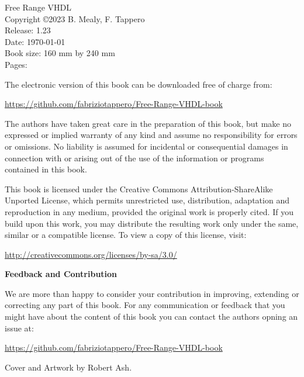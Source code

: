 %
%

{\footnotesize
\noindent
Free Range VHDL\\
Copyright \copyright 2023 B. Mealy, F. Tappero\\
Release: 1.23 \\
Date: \today\\
Book size: 160 mm by 240 mm\\
Pages: \\
\vspace{20pt}

\noindent
The electronic version of this book can be downloaded free of charge from:

\noindent
\url{https://github.com/fabriziotappero/Free-Range-VHDL-book}

\vspace{15pt}

\noindent
The authors have taken great care in the preparation of this book, but make no expressed or implied warranty of any kind and assume no responsibility for errors or omissions. No liability is assumed for incidental or consequential damages in connection with or arising out of the use of the information or programs contained in this book.

\vspace{15pt}

\noindent
This book is licensed under the Creative Commons Attribution-ShareAlike Unported License, which permits unrestricted use, distribution, adaptation and reproduction in any medium, provided the original work is properly cited. If you build upon this work, you may distribute the resulting work only under the same, similar or a compatible license. To view a copy of this license, visit:

\noindent
\url{http://creativecommons.org/licenses/by-sa/3.0/}
\vspace{25pt}

\noindent
{\sffamily\bfseries Feedback and Contribution}

\noindent
We are more than happy to consider your contribution in improving, extending or correcting any part of this book.
For any communication or feedback that you might have about the content of this book you can contact the authors opning an issue at:

\noindent
\url{https://github.com/fabriziotappero/Free-Range-VHDL-book}

\vfill
\noindent
Cover and Artwork by Robert Ash.

} %
